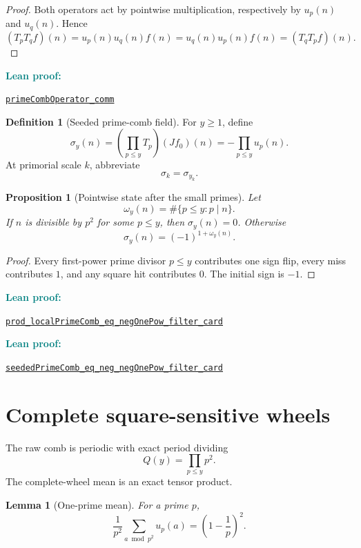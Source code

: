 \documentclass[11pt]{article}
\newtheorem{proposition}[theorem]{Proposition}
\newtheorem{lemma}[theorem]{Lemma}
\theoremstyle{definition}
\newtheorem{definition}[theorem]{Definition}
\newcommand{\leanxref}[3]{%
  \par\smallskip
  {\small\noindent\textcolor{teal}{\textbf{#1:}}\par
  \noindent\href{#3}{\nolinkurl{#2}}\par}
  \smallskip
}
\begin{document}
\begin{proof}
Both operators act by pointwise multiplication, respectively by $u_p(n)$ and $u_q(n)$.  Hence
\[
(T_pT_qf)(n)=u_p(n)u_q(n)f(n)=u_q(n)u_p(n)f(n)=(T_qT_pf)(n).
\]
\end{proof}
\leanxref{Lean proof}{primeCombOperator_comm}{https://github.com/OVVO-Financial/prime-wheel-mobius/blob/main/formalization/RHLean/Arithmetic/PrimeWheelFiniteSystem.lean}

\begin{definition}[Seeded prime-comb field]\label{def:sigma-y}
For $y\ge1$, define
\[
\sigma_y(n)=\left(\prod_{p\le y}T_p\right)(Jf_0)(n)
=-\prod_{p\le y}u_p(n).
\]
At primorial scale $k$, abbreviate
\[
\sigma_k=\sigma_{y_k}.
\]
\end{definition}

\begin{proposition}[Pointwise state after the small primes]\label{prop:sigma-pointwise}
Let
\[
\omega_y(n)=\#\{p\le y:p\mid n\}.
\]
If $n$ is divisible by $p^2$ for some $p\le y$, then $\sigma_y(n)=0$.  Otherwise
\[
\sigma_y(n)=(-1)^{1+\omega_y(n)}.
\]
\end{proposition}

\begin{proof}
Every first-power prime divisor $p\le y$ contributes one sign flip, every miss contributes $1$, and any square hit contributes $0$.  The initial sign is $-1$.
\end{proof}
\leanxref{Lean proof}{prod_localPrimeComb_eq_negOnePow_filter_card}{https://github.com/OVVO-Financial/prime-wheel-mobius/blob/main/formalization/RHLean/Arithmetic/PrimeWheelMobiusRecovery.lean}
\leanxref{Lean proof}{seededPrimeComb_eq_neg_negOnePow_filter_card}{https://github.com/OVVO-Financial/prime-wheel-mobius/blob/main/formalization/RHLean/Arithmetic/PrimeWheelMobiusRecovery.lean}

\section{Complete square-sensitive wheels}

The raw comb is periodic with exact period dividing
\[
Q(y)=\prod_{p\le y}p^2.
\]
The complete-wheel mean is an exact tensor product.

\begin{lemma}[One-prime mean]\label{lem:local-mean}
For a prime $p$,
\[
\frac1{p^2}\sum_{a\bmod p^2}u_p(a)
=\left(1-\frac1p\right)^2.
\]
\end{lemma}
\end{document}
